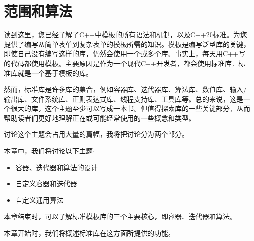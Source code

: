 \chapter{范围和算法}
读到这里，您已经了解了C++中模板的所有语法和机制，以及C++20标准。为您提供了编写从简单表单到复杂表单的模板所需的知识。模板是编写泛型库的关键，即使自己没有编写这样的库，仍然会使用一个或多个库。事实上，每天用C++写的代码都使用模板。主要原因是作为一个现代C++开发者，都会使用标准库，标准库就是一个基于模板的库。

然而，标准库是许多库的集合，例如容器库、迭代器库、算法库、数值库、输入/输出库、文件系统库、正则表达式库、线程支持库、工具库等。总的来说，这是一个很大的库，这个主题至少可以写成一本书。但值得探索库的一些关键部分，从而帮助读者们更好地理解正在或可能经常使用的一些概念和类型。

讨论这个主题会占用大量的篇幅，我将把讨论分为两个部分。

本章中，我们将讨论以下主题:

\begin{itemize}
  \item 容器、迭代器和算法的设计
  \item 自定义容器和迭代器
  \item 自定义通用算法
\end{itemize}

本章结束时，可以了解标准模板库的三个主要核心，即容器、迭代器和算法。

本章开始时，我们将概述标准库在这方面所提供的功能。







